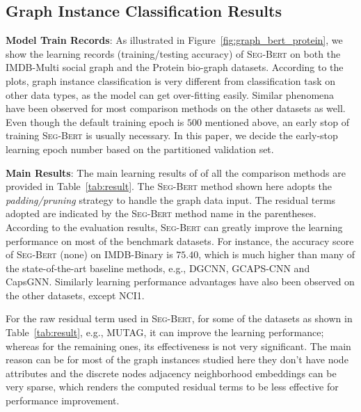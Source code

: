 \documentclass{article}
\newcommand{\our}{\textsc{Seg-Bert}}
\begin{document}
\subsection{Graph Instance Classification Results}\label{subsec:main_result}

\noindent \textbf{Model Train Records}: As illustrated in Figure~\ref{fig:graph_bert_protein}, we show the learning records (training/testing accuracy) of {\our} on both the IMDB-Multi social graph and the Protein bio-graph datasets. According to the plots, graph instance classification is very different from classification task on other data types, as the model can get over-fitting easily. Similar phenomena have been observed for most comparison methods on the other datasets as well. Even though the default training epoch is $500$ mentioned above, an early stop of training {\our} is usually necessary. In this paper, we decide the early-stop learning epoch number based on the partitioned validation set.

\noindent \textbf{Main Results}: The main learning results of of all the comparison methods are provided in Table~\ref{tab:result}. The {\our} method shown here adopts the \textit{padding/pruning} strategy to handle the graph data input. The residual terms adopted are indicated by the {\our} method name in the parentheses. According to the evaluation results, {\our} can greatly improve the learning performance on most of the benchmark datasets. For instance, the accuracy score of {\our} (none) on IMDB-Binary is $75.40$, which is much higher than many of the state-of-the-art baseline methods, e.g., DGCNN, GCAPS-CNN and CapsGNN. Similarly learning performance advantages have also been observed on the other datasets, except NCI1. 

For the raw residual term used in {\our}, for some of the datasets as shown in Table~\ref{tab:result}, e.g., MUTAG, it can improve the learning performance; whereas for the remaining ones, its effectiveness is not very significant. The main reason can be for most of the graph instances studied here they don't have node attributes and the discrete nodes adjacency neighborhood embeddings can be very sparse, which renders the computed residual terms to be less effective for performance improvement.
\end{document}
